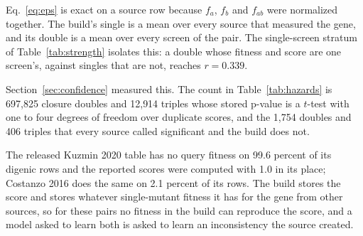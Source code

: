 Eq.~\ref{eq:eps} is exact on a source row because $f_a$, $f_b$ and $f_{ab}$ were
normalized together. The build's single is a mean over every source that measured the
gene, and its double is a mean over every screen of the pair. The single-screen
stratum of Table~\ref{tab:strength} isolates this: a double whose fitness and score
are one screen's, against singles that are not, reaches $r = 0.339$.

Section~\ref{sec:confidence} measured this. The count in Table~\ref{tab:hazards} is
697{,}825 closure doubles and 12{,}914 triples whose stored p-value is a $t$-test
with one to four degrees of freedom over duplicate scores, and the 1{,}754 doubles and
406 triples that every source called significant and the build does not.

The released Kuzmin 2020 table has no query fitness on 99.6 percent of its digenic
rows and the reported scores were computed with 1.0 in its place; Costanzo 2016 does
the same on 2.1 percent of its rows. The build stores the score and stores whatever
single-mutant fitness it has for the gene from other sources, so for these pairs no
fitness in the build can reproduce the score, and a model asked to learn both is
asked to learn an inconsistency the source created.
